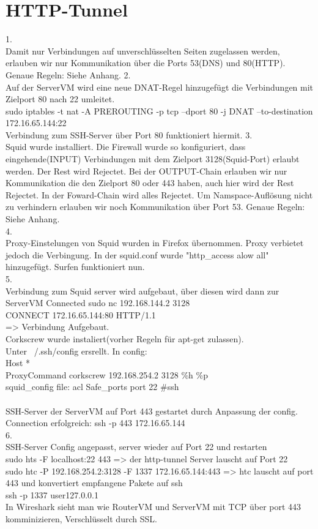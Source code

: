 \documentclass[12pt]{article}
\theoremstyle{plain}
\begin{document}
\section{HTTP-Tunnel}
1.\\
Damit nur Verbindungen auf unverschlüsselten Seiten zugelassen werden, erlauben wir nur Kommunikation über die Ports 53(DNS) und 80(HTTP). \\ Genaue Regeln: Siehe Anhang.
2.\\
Auf der ServerVM wird eine neue DNAT-Regel hinzugefügt die Verbindungen mit Zielport 80 nach 22 umleitet.\\
sudo iptables -t nat -A PREROUTING -p tcp --dport 80 -j DNAT --to-destination 172.16.65.144:22\\
Verbindung zum SSH-Server über Port 80 funktioniert hiermit.
3.\\
Squid wurde installiert.
Die Firewall wurde so konfiguriert, dass eingehende(INPUT) Verbindungen mit dem Zielport 3128(Squid-Port) erlaubt werden. Der Rest wird Rejectet. Bei der OUTPUT-Chain erlauben wir nur Kommunikation die den Zielport 80 oder 443 haben, auch hier wird der Rest Rejectet. In der Foward-Chain wird alles Rejectet. Um Namspace-Auflösung nicht zu verhindern erlauben wir noch Kommunikation über Port 53. Genaue Regeln: Siehe Anhang.\\
4.\\
Proxy-Einstelungen von Squid wurden in Firefox übernommen. Proxy verbietet jedoch die Verbingung. In der squid.conf wurde "http\_access alow all" hinzugefügt. Surfen funktioniert nun.\\
5.\\
Verbindung zum Squid server wird aufgebaut, über diesen wird dann zur ServerVM Connected
sudo nc 192.168.144.2 3128\\
CONNECT 172.16.65.144:80 HTTP/1.1\\
=> Verbindung Aufgebaut.\\
Corkscrew wurde instaliert(vorher Regeln für apt-get zulassen).\\
Unter ~/.ssh/config ersrellt. In config:\\
Host *\\
ProxyCommand corkscrew 192.168.254.2 3128 \%h \%p\\
squid\_config file: acl Safe\_ports port 22 \#ssh\\\\
SSH-Server der ServerVM auf Port 443 gestartet durch Anpassung der config.
Connection erfolgreich: ssh -p 443 172.16.65.144\\
6.\\
SSH-Server Config angepasst, server wieder auf Port 22 und restarten\\
sudo hts -F localhost:22 443 => der http-tunnel Server lauscht auf Port 22\\
sudo htc -P 192.168.254.2:3128 -F 1337 172.16.65.144:443 => htc lauscht auf port 443 und konvertiert empfangene Pakete auf ssh\\
ssh -p 1337 user\@127.0.0.1\\
In Wireshark sieht man wie RouterVM und ServerVM mit TCP über port 443 komminizieren, Verschlüsselt durch SSL.\\
\end{document}
